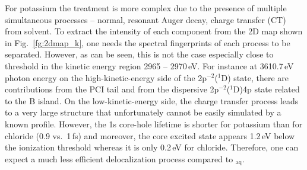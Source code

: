 For potassium the treatment is more complex due to the presence of multiple simultaneous processes -- normal, resonant Auger decay, charge transfer (CT) from solvent. To extract the intensity of each component from the 2D map shown in Fig.\ \ref{fg:2dmap_k}, one needs the spectral fingerprints of each process to be separated. However, as can be seen, this is not the case especially close to threshold in the kinetic energy region 2965 -- 2970\,eV. For instance at 3610.7\,eV photon energy on the high-kinetic-energy side of the 2p$^{-2}$($^1$D) state, there are contributions from the PCI tail and from the dispersive 2p$^{-2}$($^1$D)4p state related to the B island. On the low-kinetic-energy side, the charge transfer process leads to a very large structure that unfortunately cannot be easily simulated by a known profile. However, the 1s core-hole lifetime is shorter for potassium than for chloride (0.9 vs.\ 1\,fs) and moreover, the core excited state appears 1.2\,eV below the ionization threshold whereas it is only 0.2\,eV for chloride. Therefore, one can expect a much less efficient delocalization process compared to \cli$_{\text{aq}}$.

